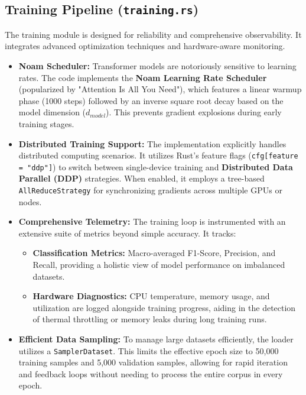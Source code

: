 \documentclass[11pt,a4paper]{article}
\begin{document}
\subsection{Training Pipeline (\texttt{training.rs})}
The training module is designed for reliability and comprehensive observability. It integrates advanced optimization techniques and hardware-aware monitoring.
\begin{itemize}
    \item \textbf{Noam Scheduler:} Transformer models are notoriously sensitive to learning rates. The code implements the \textbf{Noam Learning Rate Scheduler} (popularized by "Attention Is All You Need"), which features a linear warmup phase (1000 steps) followed by an inverse square root decay based on the model dimension ($d_{model}$). This prevents gradient explosions during early training stages.
    
    \item \textbf{Distributed Training Support:} The implementation explicitly handles distributed computing scenarios. It utilizes Rust's feature flags (\texttt{cfg[feature = "ddp"]}) to switch between single-device training and \textbf{Distributed Data Parallel (DDP)} strategies. When enabled, it employs a tree-based \texttt{AllReduceStrategy} for synchronizing gradients across multiple GPUs or nodes.
    
    \item \textbf{Comprehensive Telemetry:} The training loop is instrumented with an extensive suite of metrics beyond simple accuracy. It tracks:
    \begin{itemize}
        \item \textbf{Classification Metrics:} Macro-averaged F1-Score, Precision, and Recall, providing a holistic view of model performance on imbalanced datasets.
        \item \textbf{Hardware Diagnostics:} CPU temperature, memory usage, and utilization are logged alongside training progress, aiding in the detection of thermal throttling or memory leaks during long training runs.
    \end{itemize}
    
    \item \textbf{Efficient Data Sampling:} To manage large datasets efficiently, the loader utilizes a \texttt{SamplerDataset}. This limits the effective epoch size to 50,000 training samples and 5,000 validation samples, allowing for rapid iteration and feedback loops without needing to process the entire corpus in every epoch.
\end{itemize}
\end{document}
